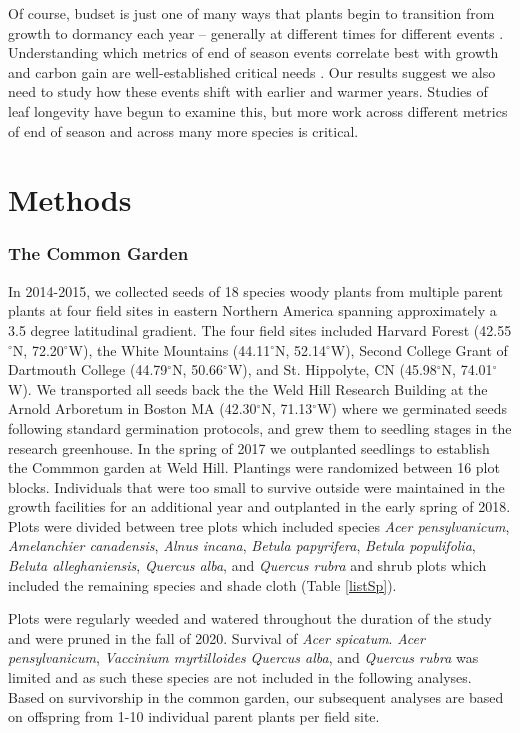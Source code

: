 \documentclass{article}[12pt]
\begin{document}
Of course, budset is just one of many ways that plants begin to transition from growth to dormancy each year -- generally at different times for different events \citep{Michelson2018}. Understanding which metrics of end of season events correlate best with growth and carbon gain are well-established critical needs \citep{GALLINAT2015}. Our results suggest we also need to study how these events shift with earlier and warmer years. Studies of leaf longevity have begun to examine this, but more work across different metrics of end of season and across many more species is critical.
 
 
\section{Methods} %
\subsubsection{The Common Garden}
In 2014-2015, we collected seeds of 18 species woody plants from multiple parent plants at four field sites in eastern Northern America spanning approximately a 3.5 degree latitudinal gradient. The four field sites included Harvard Forest (42.55$^{\circ}$N, 72.20$^{\circ}$W), the White Mountains (44.11$^{\circ}$N, 52.14$^{\circ}$W), Second College Grant of Dartmouth College (44.79$^{\circ}$N, 50.66$^{\circ}$W), and St. Hippolyte, CN (45.98$^{\circ}$N, 74.01$^{\circ}$W). We transported all seeds back the the Weld Hill Research Building at the Arnold Arboretum in Boston MA (42.30$^{\circ}$N, 71.13$^{\circ}$W) where we germinated seeds following standard germination protocols, and grew them to seedling stages in the research greenhouse. In the spring of 2017 we outplanted seedlings to establish the Commmon garden at Weld Hill. Plantings were randomized between 16 plot blocks. Individuals that were too small to survive outside were maintained in the growth facilities for an additional year and outplanted in the early spring of 2018. Plots were divided between tree plots which included species  \textit{Acer pensylvanicum}, \textit{Amelanchier canadensis}, \textit{Alnus incana}, \textit{Betula papyrifera}, \textit{Betula populifolia}, \textit{Beluta alleghaniensis}, \textit{Quercus alba}, and \textit{Quercus rubra} and shrub plots which included the remaining species and shade cloth (Table \ref{listSp}). 

Plots were regularly weeded and watered throughout the duration of the study and were pruned in the fall of 2020. Survival of \textit{Acer spicatum}. \textit{Acer pensylvanicum}, \emph{Vaccinium myrtilloides} \textit{Quercus alba}, and \textit{Quercus rubra} was limited and as such these species are not included in the following analyses. Based on survivorship in the common garden, our subsequent analyses are based on offspring from 1-10 individual parent plants per field site.
\end{document}
